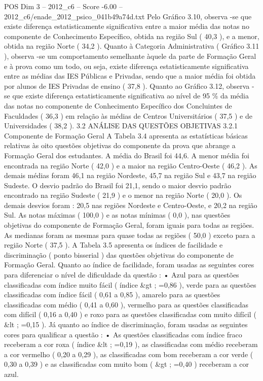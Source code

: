 \begin{textsample}{POS Dim 3 – 2012\_c6 – Score -6.00 – 2012\_c6/enade\_2012\_psico\_041b49a74d.txt}
Pelo Gráfico 3.10, observa -se que existe diferença estatisticamente significativa entre a maior média das notas no componente de Conhecimento Específico, obtida na região Sul ( 40,3 ), e a menor, obtida na região Norte ( 34,2 ).
Quanto à Categoria Administrativa ( Gráfico 3.11 ), observa -se um comportamento semelhante àquele da parte de Formação Geral e à prova como um todo, ou seja, existe diferença estatisticamente significativa entre as médias das IES Públicas e Privadas, sendo que a maior média foi obtida por alunos de IES Privadas de ensino ( 37,8 ).
Quanto ao Gráfico 3.12, observa -se que existe diferença estatisticamente significativa ao nível de 95 \% da média das notas no componente de Conhecimento Específico dos Concluintes de Faculdades ( 36,3 ) em relação às médias de Centros Universitários ( 37,5 ) e de Universidades ( 38,2 ). 3.2 ANÁLISE DAS QUESTÕES OBJETIVAS 3.2.1 Componente de Formação Geral A Tabela 3.4 apresenta as estatísticas básicas relativas às oito questões objetivas do componente da prova que abrange a Formação Geral dos estudantes.
A média do Brasil foi 44,6.
A menor média foi encontrada na região Norte ( 42,0 ) e a maior na região Centro-Oeste ( 46,2 ).
As demais médias foram 46,1 na região Nordeste, 45,7 na região Sul e 43,7 na região Sudeste.
O desvio padrão do Brasil foi 21,1, sendo o maior desvio padrão encontrado na região Sudeste ( 21,9 ) e o menor na região Norte ( 20,0 ).
Os demais desvios foram : 20,5 nas regiões Nordeste e Centro-Oeste, e 20,2 na região Sul.
As notas máximas ( 100,0 ) e as notas mínimas ( 0,0 ), nas questões objetivas do componente de Formação Geral, foram iguais para todas as regiões.
As medianas foram as mesmas para quase todas as regiões ( 50,0 ) exceto para a região Norte ( 37,5 ).
A Tabela 3.5 apresenta os índices de facilidade e discriminação ( ponto bisserial ) das questões objetivas do componente de Formação Geral.
Quanto ao índice de facilidade, foram usadas as seguintes cores para diferenciar o nível de dificuldade da questão : • Azul para as questões classificadas com índice muito fácil ( índice \&gt ; =0,86 ), verde para as questões classificadas com índice fácil ( 0,61 a 0,85 ), amarelo para as questões classificadas com médio ( 0,41 a 0,60 ), vermelho para as questões classificadas com difícil ( 0,16 a 0,40 ) e roxo para as questões classificadas com muito difícil ( \&lt ; =0,15 ).
Já quanto ao índice de discriminação, foram usadas as seguintes cores para qualificar a questão : • As questões classificadas com índice fraco receberam a cor roxa ( índice \&lt ; =0,19 ), as classificadas com médio receberam a cor vermelho ( 0,20 a 0,29 ), as classificadas com bom receberam a cor verde ( 0,30 a 0,39 ) e as classificadas com muito bom ( \&gt ; =0,40 ) receberam a cor azul.

\end{textsample}
